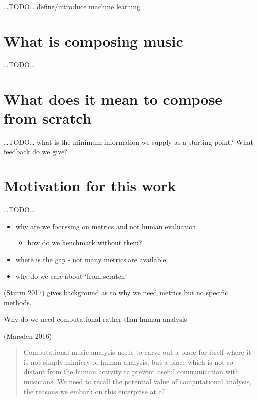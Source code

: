 \documentclass[12pt,a4paper,]{report}
\providecommand{\tightlist}{%
  \setlength{\itemsep}{0pt}\setlength{\parskip}{0pt}}
\begin{document}
\ldots TODO\ldots{} define/introduce machine learning

\hypertarget{what-is-composing-music}{%
\section{What is composing music}\label{what-is-composing-music}}

\ldots TODO\ldots{}

\hypertarget{what-does-it-mean-to-compose-from-scratch}{%
\section{What does it mean to compose from
scratch}\label{what-does-it-mean-to-compose-from-scratch}}

\ldots TODO\ldots{} what is the minimum information we supply as a
starting point? What feedback do we give?

\hypertarget{motivation-for-this-work}{%
\section{Motivation for this work}\label{motivation-for-this-work}}

\ldots TODO\ldots{}

\begin{itemize}
\tightlist
\item
  why are we focussing on metrics and not human evaluation

  \begin{itemize}
  \tightlist
  \item
    how do we benchmark without them?
  \end{itemize}
\item
  where is the gap - not many metrics are available
\item
  why do we care about `from scratch'
\end{itemize}

(Sturm 2017) gives background as to why we need metrics but no specific
methods.

Why do we need computational rather than human analysis

(Marsden 2016)

\begin{quote}
Computational music analysis needs to carve out a place for itself where
it is not simply mimicry of human analysis, but a place which is not so
distant from the human activity to prevent useful communication with
musicians. We need to recall the potential value of computational
analysis, the reasons we embark on this enterprise at all.
\end{quote}
\end{document}
